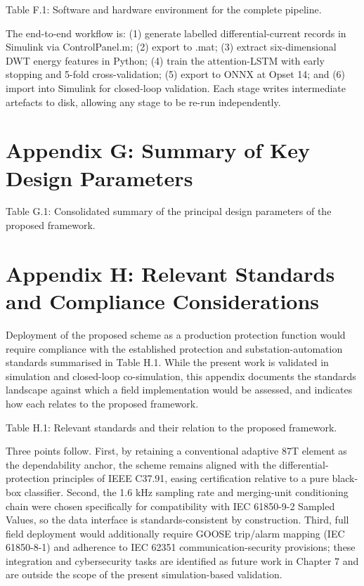 Table F.1: Software and hardware environment for the complete pipeline.

The end-to-end workflow is: (1) generate labelled differential-current records in Simulink via ControlPanel.m; (2) export to .mat; (3) extract six-dimensional DWT energy features in Python; (4) train the attention-LSTM with early stopping and 5-fold cross-validation; (5) export to ONNX at Opset 14; and (6) import into Simulink for closed-loop validation. Each stage writes intermediate artefacts to disk, allowing any stage to be re-run independently.


\section{Appendix G: Summary of Key Design Parameters}
Table G.1: Consolidated summary of the principal design parameters of the proposed framework.


\section{Appendix H: Relevant Standards and Compliance Considerations}
Deployment of the proposed scheme as a production protection function would require compliance with the established protection and substation-automation standards summarised in Table H.1. While the present work is validated in simulation and closed-loop co-simulation, this appendix documents the standards landscape against which a field implementation would be assessed, and indicates how each relates to the proposed framework.

Table H.1: Relevant standards and their relation to the proposed framework.

Three points follow. First, by retaining a conventional adaptive 87T element as the dependability anchor, the scheme remains aligned with the differential-protection principles of IEEE C37.91, easing certification relative to a pure black-box classifier. Second, the 1.6 kHz sampling rate and merging-unit conditioning chain were chosen specifically for compatibility with IEC 61850-9-2 Sampled Values, so the data interface is standards-consistent by construction. Third, full field deployment would additionally require GOOSE trip/alarm mapping (IEC 61850-8-1) and adherence to IEC 62351 communication-security provisions; these integration and cybersecurity tasks are identified as future work in Chapter 7 and are outside the scope of the present simulation-based validation.

